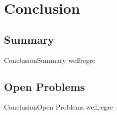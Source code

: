 \documentclass[10pt,%
				]{beamer}
\begin{document}
	\section{Conclusion}
	
	\subsection{Summary}
	\begin{frame}{Conclusion}{Summary}
		weffregre
	\end{frame}

	\subsection{Open Problems}
	\begin{frame}{Conclusion}{Open Problems}
		weffregre
	\end{frame}
\end{document}
